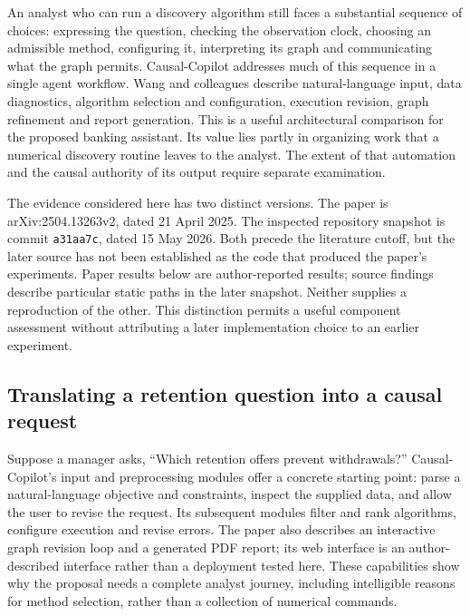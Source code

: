 An analyst who can run a discovery algorithm still faces a substantial sequence
of choices: expressing the question, checking the observation clock, choosing
an admissible method, configuring it, interpreting its graph and communicating
what the graph permits. Causal-Copilot addresses much of this sequence in a
single agent workflow. Wang and colleagues describe natural-language input,
data diagnostics, algorithm selection and configuration, execution revision,
graph refinement and report generation. This is a useful architectural
comparison for the proposed banking assistant. Its value lies partly in
organizing work that a numerical discovery routine leaves to the analyst.
The extent of that automation and the causal authority of its output require
separate examination.~\citep{exec17_copilot_paper}

The evidence considered here has two distinct versions. The paper is
arXiv:2504.13263v2, dated 21 April 2025. The inspected repository snapshot is
commit \texttt{a31aa7c}, dated 15 May 2026. Both precede the literature cutoff,
but the later source has not been established as the code that produced the
paper's experiments. Paper results below are author-reported results;
source findings describe particular static paths in the later snapshot.
Neither supplies a reproduction of the other. This distinction permits a
useful component assessment without attributing a later implementation choice
to an earlier experiment.~\citep{exec17_copilot_paper,exec17_copilot_code}

\subsection{Translating a retention question into a causal request}

Suppose a manager asks, ``Which retention offers prevent withdrawals?''
Causal-Copilot's input and preprocessing modules offer a concrete starting
point: parse a natural-language objective and constraints, inspect the supplied
data, and allow the user to revise the request. Its subsequent modules filter
and rank algorithms, configure execution and revise errors. The paper also
describes an interactive graph revision loop and a generated PDF report;
its web interface is an author-described interface rather than a deployment
tested here. These capabilities show why the proposal needs a complete
analyst journey, including intelligible reasons for method selection, rather
than a collection of numerical commands.~\citep{exec17_copilot_paper}

